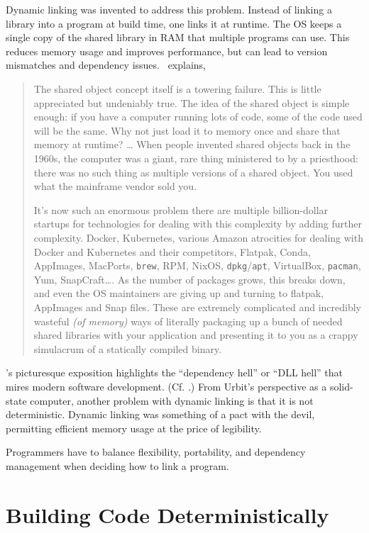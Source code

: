 \documentclass[twoside]{article}
\begin{document}
Dynamic linking was invented to address this problem.  Instead of linking a library into a program at build time, one links it at runtime.  The OS keeps a single copy of the shared library in RAM that multiple programs can use.  This reduces memory usage and improves performance, but can lead to version mismatches and dependency issues.  \citeauthor{Locklin2022}~explains,

\begin{quote}
The shared object concept itself is a towering failure. This is little appreciated but undeniably true. The idea of the shared object is simple enough: if you have a computer running lots of code, some of the code used will be the same. Why not just load it to memory once and share that memory at runtime? … When people invented shared objects back in the 1960s, the computer was a giant, rare thing ministered to by a priesthood: there was no such thing as multiple versions of a shared object. You used what the mainframe vendor sold you.

It’s now such an enormous problem there are multiple billion-dollar startups for technologies for dealing with this complexity by adding further complexity. Docker, Kubernetes, various Amazon atrocities for dealing with Docker and Kubernetes and their competitors, Flatpak, Conda, AppImages, MacPorts, \texttt{brew}, RPM, NixOS, \texttt{dpkg}/\texttt{apt}, VirtualBox, \texttt{pacman}, Yum, SnapCraft…. As the number of packages grows, this breaks down, and even the OS maintainers are giving up and turning to flatpak, AppImages and Snap files. 
These are extremely complicated and incredibly wasteful \emph{(of memory)} ways of literally packaging up a bunch of needed shared libraries with your application and presenting it to you as a crappy simulacrum of a statically compiled binary.  \citep{Locklin2022}
\end{quote}

\noindent
\citeauthor{Locklin2022}'s picturesque exposition highlights the “dependency hell” or “DLL hell” that mires modern software development.  (Cf. \citet{Grimes2003}.)  From Urbit's perspective as a solid-state computer, another problem with dynamic linking is that it is not deterministic.  Dynamic linking was something of a pact with the devil, permitting efficient memory usage at the price of legibility.

Programmers have to balance flexibility, portability, and dependency management when deciding how to link a program.


\section{Building Code Deterministically}
\end{document}

